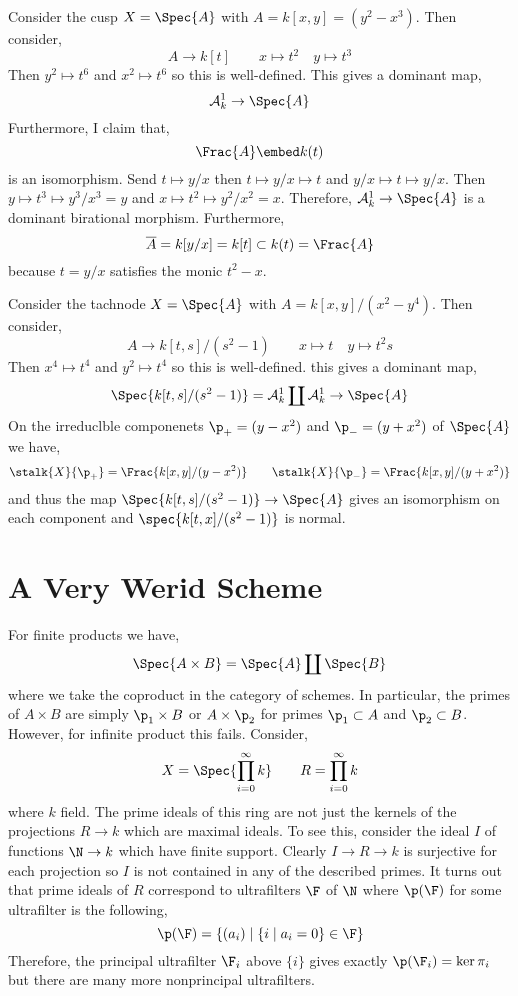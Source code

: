 \documentclass[12pt]{article}
\begin{document}
\begin{example}
Consider the cusp $X = \Spec{A}$ with $A = k[x,y] = (y^2 - x^3)$. Then consider,
\[ A \to k[t] \quad \quad x \mapsto t^2 \quad y \mapsto t^3 \]
Then $y^2 \mapsto t^6$ and $x^2 \mapsto t^6$ so this is well-defined. This gives a dominant map,
\[ \A^1_k \to \Spec{A} \]
Furthermore, I claim that,
\[ \Frac{A} \embed k(t) \]
is an isomorphism. Send $t \mapsto y/x$ then $t \mapsto y/x \mapsto t$ and $y/x \mapsto t \mapsto y/x$. Then $y \mapsto t^3 \mapsto y^3 / x^3 = y$ and $x \mapsto t^2 \mapsto y^2 / x^2 = x$. Therefore, $\A^1_k \to \Spec{A}$ is a dominant birational morphism. Furthermore,
\[ \overline{A} = k[y/x] = k[t] \subset k(t) = \Frac{A} \]
because $t = y/x$ satisfies the monic $t^2 - x$. 
\end{example}

\begin{example}
Consider the tachnode $X = \Spec{A}$ with $A = k[x,y]/(x^2 - y^4)$. Then consider,
\[ A \to k[t, s]/(s^2 - 1) \quad \quad x \mapsto t \quad y \mapsto t^2 s \]
Then $x^4 \mapsto t^4$ and $y^2 \mapsto t^4$ so this is well-defined. this gives a dominant map,
\[ \Spec{k[t,s]/(s^2 - 1)} = \A^1_k \coprod \A^1_k \to \Spec{A} \]
On the irreduclble componenets $\p_{+} = (y - x^2)$ and $\p_{-} = (y + x^2)$ of $\Spec{A}$ we have,
\[ \stalk{X}{\p_{+}} = \Frac{k[x,y]/(y - x^2)} \quad \quad \stalk{X}{\p_{-}} = \Frac{k[x,y]/(y + x^2)} \]
and thus the map $\Spec{k[t, s]/(s^2 - 1)} \to \Spec{A}$ gives an isomorphism on each component and $\spec{k[t, x]/(s^2 - 1)}$ is normal. 
\end{example}

\section{A Very Werid Scheme}

For finite products we have,
\[ \Spec{A \times B} = \Spec{A} \coprod \Spec{B} \]
where we take the coproduct in the category of schemes. In particular, the primes of $A \times B$ are simply $\p_1 \times B$ or $A \times \p_2$ for primes $\p_1 \subset A$ and $\p_2 \subset B$. However, for infinite product this fails. Consider,
\[ X = \Spec{\prod\limits_{i = 0}^\infty k} \quad \quad R = \prod\limits_{i = 0}^\infty k \]
where $k$ field. The prime ideals of this ring are not just the kernels of the projections $R \to k$ which are maximal ideals. To see this, consider the ideal $I$ of functions $\N \to k$ which have finite support. Clearly $I \to R \to k$ is surjective for each projection so $I$ is not contained in any of the described primes. It turns out that prime ideals of $R$ correspond to ultrafilters $\F$ of $\N$ where $\p(\F)$ for some ultrafilter is the following,
\[ \p(\F) = \{ (a_i) \mid \{ i \mid a_i = 0 \} \in \F \} \]
Therefore, the principal ultrafilter $\F_i$ above $\{ i \}$ gives exactly $\p(\F_i) = \ker{\pi_i}$ but there are many more nonprincipal ultrafilters. 
\end{document}
